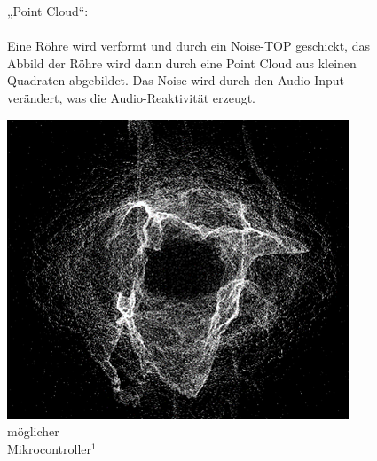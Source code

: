 \documentclass[12pt]{scrartcl}%
\theoremstyle{nonumberplain}
\begin{document}
\begin{figure}[h]
   \begin{minipage}[b]{.4\linewidth}
     „Point Cloud“:
     \\\\
     Eine Röhre wird verformt und durch ein Noise-TOP geschickt, das Abbild der Röhre wird dann durch 	eine Point Cloud aus kleinen Quadraten abgebildet. Das Noise wird durch den Audio-Input verändert, 	was die Audio-Reaktivität erzeugt.
   \end{minipage}
   \hspace{.1\linewidth}
   \begin{minipage}[b]{.4\linewidth}
   \vspace{50pt}
      \includegraphics[scale=1]{sunvox_3}
      \caption{möglicher\\Mikrocontroller${}^{1}$}
   \end{minipage}
\end{figure}
\end{document}
